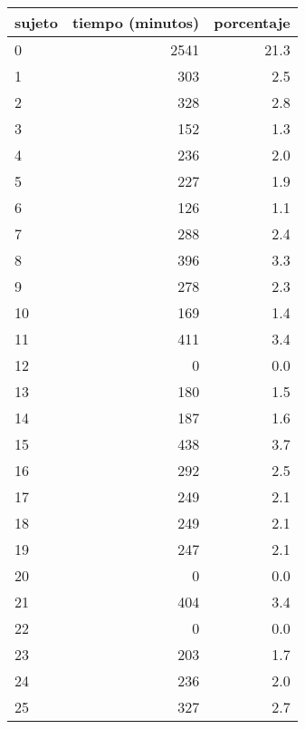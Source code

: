 \documentclass[spanish]{article}
\begin{document}
\begin{table}[h!]
\begin{center}
\begin{tabular}{|l|r|r|}
\hline
sujeto & tiempo (minutos) & porcentaje    \\ \hline
     0 &             2541 &           21.3\\ \hline
     1 &              303 &            2.5\\ \hline
     2 &              328 &            2.8\\ \hline
     3 &              152 &            1.3\\ \hline
     4 &              236 &            2.0\\ \hline
     5 &              227 &            1.9\\ \hline
     6 &              126 &            1.1\\ \hline
     7 &              288 &            2.4\\ \hline
     8 &              396 &            3.3\\ \hline
     9 &              278 &            2.3\\ \hline
    10 &              169 &            1.4\\ \hline
    11 &              411 &            3.4\\ \hline
    12 &                0 &            0.0\\ \hline
    13 &              180 &            1.5\\ \hline
    14 &              187 &            1.6\\ \hline
    15 &              438 &            3.7\\ \hline
    16 &              292 &            2.5\\ \hline
    17 &              249 &            2.1\\ \hline
    18 &              249 &            2.1\\ \hline
    19 &              247 &            2.1\\ \hline
    20 &                0 &            0.0\\ \hline
    21 &              404 &            3.4\\ \hline
    22 &                0 &            0.0\\ \hline
    23 &              203 &            1.7\\ \hline
    24 &              236 &            2.0\\ \hline
    25 &              327 &            2.7\\ \hline

\end{tabular}
\end{center}
\end{table}
\end{document}

